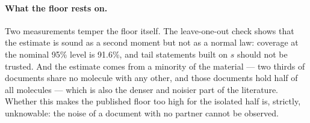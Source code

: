 \paragraph{What the floor rests on.} Two measurements temper the floor itself. The leave-one-out check shows that the estimate is sound as a second moment but not as a normal law: coverage at the nominal 95\% level is 91.6\%, and tail statements built on $\hat s$ should not be trusted. And the estimate comes from a minority of the material --- two thirds of documents share no molecule with any other, and those documents hold half of all molecules --- which is also the denser and noisier part of the literature. Whether this makes the published floor too high for the isolated half is, strictly, unknowable: the noise of a document with no partner cannot be observed.


